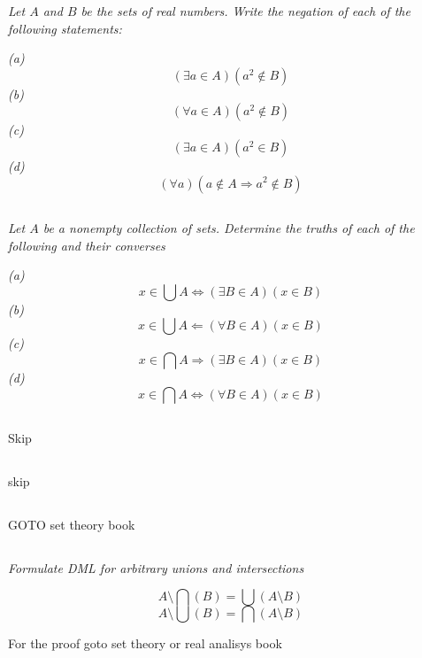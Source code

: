 \documentclass[11pt,oneside,titlepage]{book}
\DeclareMathOperator \lra {\Leftrightarrow}
\DeclareMathOperator \la {\Leftarrow}
\DeclareMathOperator \ra {\Rightarrow}
\begin{document}
\textit{Let $A$ and $B$ be the sets of real numbers. Write the negation of each of the
  following statements: }

\textit{(a)}
$$ (\exists a \in A)(a^2 \notin B)$$
\textit{(b)}
$$ (\forall a \in A)(a^2 \notin B)$$
\textit{(c)}
$$ (\exists a \in A)(a^2 \in B)$$
\textit{(d) }
$$ (\forall a)(a \notin A \ra a^2 \notin B)$$

\subsection{}

\textit{Let $A$ be a nonempty collection of sets. Determine the truths of each of the
  following and their converses}

\textit{(a)
$$x \in \bigcup{A} \lra (\exists B \in A)(x \in B)$$}
\textit{(b)
$$x \in \bigcup{A} \la (\forall B \in A)(x \in B)$$}
\textit{(c)
$$x \in \bigcap{A} \ra (\exists B \in A)(x \in B)$$}
\textit{(d)
$$x \in \bigcap{A} \lra (\forall B \in A)(x \in B)$$}

\subsection{}

Skip

\subsection{}

skip

\subsection{}

GOTO set theory book

\subsection{}

\textit{Formulate DML for arbitrary unions and intersections}

$$A \setminus \bigcap{(B)} = \bigcup{(A \setminus B)} $$
$$A \setminus \bigcup{(B)} = \bigcap{(A \setminus B)} $$

For the proof goto set theory or real analisys book

\subsection{}
\end{document}
